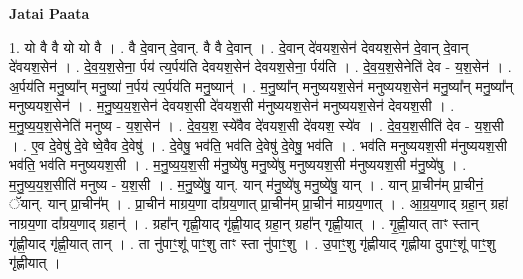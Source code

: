 \documentclass[17pt]{extarticle}
\begin{document}
\textbf{Jatai Paata} \newline

1. यो वै वै यो यो वै । . वै दे॒वान् दे॒वान्. वै वै दे॒वान् । . दे॒वान् दे॑वयश॒सेन॑ देवयश॒सेन॑ दे॒वान् दे॒वान् दे॑वयश॒सेन॑ । . दे॒व॒य॒श॒सेना॒ र्पय॑ त्य॒र्पय॑ति देवयश॒सेन॑ देवयश॒सेना॒ र्पय॑ति । . दे॒व॒य॒श॒सेनेति॑ देव - य॒श॒सेन॑ । . अ॒र्पय॑ति मनु॒ष्या᳚न् मनु॒ष्या॑ न॒र्पय॑ त्य॒र्पय॑ति मनु॒ष्यान्॑ । . म॒नु॒ष्या᳚न् मनुष्ययश॒सेन॑ मनुष्ययश॒सेन॑ मनु॒ष्या᳚न् मनु॒ष्या᳚न् मनुष्ययश॒सेन॑ । . म॒नु॒ष्य॒य॒श॒सेन॑ देवयश॒सी दे॑वयश॒सी म॑नुष्ययश॒सेन॑ मनुष्ययश॒सेन॑ देवयश॒सी । . म॒नु॒ष्य॒य॒श॒सेनेति॑ मनुष्य - य॒श॒सेन॑ । . दे॒व॒य॒श॒ स्ये॑वैव दे॑वयश॒सी दे॑वयश॒ स्ये॑व । . दे॒व॒य॒श॒सीति॑ देव - य॒श॒सी । . ए॒व दे॒वेषु॑ दे॒वे ष्वे॒वैव दे॒वेषु॑ । . दे॒वेषु॒ भव॑ति॒ भव॑ति दे॒वेषु॑ दे॒वेषु॒ भव॑ति । . भव॑ति मनुष्ययश॒सी म॑नुष्ययश॒सी भव॑ति॒ भव॑ति मनुष्ययश॒सी । . म॒नु॒ष्य॒य॒श॒सी म॑नु॒ष्ये॑षु मनु॒ष्ये॑षु मनुष्ययश॒सी म॑नुष्ययश॒सी म॑नु॒ष्ये॑षु । . म॒नु॒ष्य॒य॒श॒सीति॑ मनुष्य - य॒श॒सी । . म॒नु॒ष्ये॑षु॒ यान्. यान् म॑नु॒ष्ये॑षु मनु॒ष्ये॑षु॒ यान् । . यान् प्रा॒चीन॑म् प्रा॒चीनं॒ ॅयान्. यान् प्रा॒चीन᳚म् । . प्रा॒चीन॑ माग्रय॒णा दा᳚ग्रय॒णात् प्रा॒चीन॑म् प्रा॒चीन॑ माग्रय॒णात् । . आ॒ग्र॒य॒णाद् ग्रहा॒न् ग्रहा॑ नाग्रय॒णा दा᳚ग्रय॒णाद् ग्रहान्॑ । . ग्रहा᳚न् गृह्णी॒याद् गृ॑ह्णी॒याद् ग्रहा॒न् ग्रहा᳚न् गृह्णी॒यात् । . गृ॒ह्णी॒यात् ताꣳ स्तान् गृ॑ह्णी॒याद् गृ॑ह्णी॒यात् तान् । . ता नु॑पाꣳ॒॒शू॑ पाꣳ॒॒शु ताꣳ स्ता नु॑पाꣳ॒॒शु । . उ॒पाꣳ॒॒शु गृ॑ह्णीयाद् गृह्णीया दुपाꣳ॒॒शू॑ पाꣳ॒॒शु गृ॑ह्णीयात् । \newline
\end{document}
